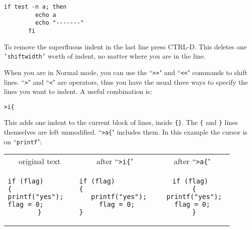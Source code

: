 \begin{Verbatim}[samepage=true]
    if test -n a; then 
         echo a 
         echo "-------" 
       fi 
\end{Verbatim}

To remove the superfluous indent in the last line press CTRL-D.
This deletes one \texttt{'shiftwidth'} worth of indent, no matter where you are in the line.

When you are in Normal mode, you can use the ``\texttt{>>}" and ``\texttt{<<}" commands to shift lines.
``\texttt{>}" and ``\texttt{<}" are operators, thus you have the usual three ways to specify the lines you want to indent.
A useful combination is:

\begin{Verbatim}[samepage=true]
 >i{
\end{Verbatim}

This adds one indent to the current block of lines, inside \texttt{\{\}}.
The \texttt{\{} and \texttt{\}} lines themselves are left unmodified.
``\texttt{>a\{}" includes them.
In this example the cursor is on ``\texttt{printf}":

\begin{center} \begin{tabular}{|c|c|c|}
				\hline
				original text & after ``\texttt{>i\{}" & after ``\texttt{>a\{}" \\ 
				\begin{minipage}{4cm}
				\begin{verbatim}
if (flag)       
{               
printf("yes");  
flag = 0;       
}
				\end{verbatim}
				\end{minipage}
& 
				\begin{minipage}{4cm}
				\begin{verbatim}
if (flag)         
{                 
  printf("yes");
  flag = 0; 
}                 
				\end{verbatim}
				\end{minipage}
&
				\begin{minipage}{4cm}
				\begin{verbatim}
if (flag) 
  { 
  printf("yes"); 
  flag = 0;  
  } 
				\end{verbatim}
				\end{minipage} \\
				\hline
\end{tabular} \end{center}

